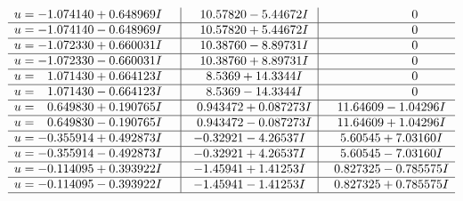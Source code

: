 \documentclass[1p]{elsarticle_modified}
\theoremstyle{definition}
\begin{document}
$$\begin{array}{c|c|c}
\begin{aligned}
u &= -1.074140 + 0.648969 I\end{aligned}
 & \phantom{-}10.57820 - 5.44672 I & \phantom{-0.000000 } 0 \\ \hline\begin{aligned}
u &= -1.074140 - 0.648969 I\end{aligned}
 & \phantom{-}10.57820 + 5.44672 I & \phantom{-0.000000 } 0 \\ \hline\begin{aligned}
u &= -1.072330 + 0.660031 I\end{aligned}
 & \phantom{-}10.38760 - 8.89731 I & \phantom{-0.000000 } 0 \\ \hline\begin{aligned}
u &= -1.072330 - 0.660031 I\end{aligned}
 & \phantom{-}10.38760 + 8.89731 I & \phantom{-0.000000 } 0 \\ \hline\begin{aligned}
u &= \phantom{-}1.071430 + 0.664123 I\end{aligned}
 & \phantom{-}8.5369 + 14.3344 I & \phantom{-0.000000 } 0 \\ \hline\begin{aligned}
u &= \phantom{-}1.071430 - 0.664123 I\end{aligned}
 & \phantom{-}8.5369 - 14.3344 I & \phantom{-0.000000 } 0 \\ \hline\begin{aligned}
u &= \phantom{-}0.649830 + 0.190765 I\end{aligned}
 & \phantom{-}0.943472 + 0.087273 I & \phantom{-}11.64609 - 1.04296 I \\ \hline\begin{aligned}
u &= \phantom{-}0.649830 - 0.190765 I\end{aligned}
 & \phantom{-}0.943472 - 0.087273 I & \phantom{-}11.64609 + 1.04296 I \\ \hline\begin{aligned}
u &= -0.355914 + 0.492873 I\end{aligned}
 & -0.32921 - 4.26537 I & \phantom{-}5.60545 + 7.03160 I \\ \hline\begin{aligned}
u &= -0.355914 - 0.492873 I\end{aligned}
 & -0.32921 + 4.26537 I & \phantom{-}5.60545 - 7.03160 I \\ \hline\begin{aligned}
u &= -0.114095 + 0.393922 I\end{aligned}
 & -1.45941 + 1.41253 I & \phantom{-}0.827325 - 0.785575 I \\ \hline\begin{aligned}
u &= -0.114095 - 0.393922 I\end{aligned}
 & -1.45941 - 1.41253 I & \phantom{-}0.827325 + 0.785575 I\\
 \hline 
 \end{array}$$\newpage\newpage\renewcommand{\arraystretch}{1}
\end{document}
